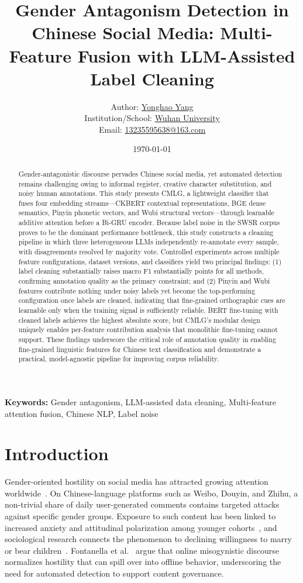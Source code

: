 ﻿\documentclass[12pt]{article}
\title{Gender Antagonism Detection in Chinese Social Media: Multi-Feature Fusion with LLM-Assisted Label Cleaning}
\author{%
Author: \underline{Yonghao Yang} \\
Institution/School: \underline{Wuhan University} \\
Email: \underline{13235595638@163.com}%
}
\date{\today}
\begin{document}
\maketitle

\begin{abstract}
Gender-antagonistic discourse pervades Chinese social media, yet automated detection remains challenging owing to informal register, creative character substitution, and noisy human annotations. This study presents CMLG, a lightweight classifier that fuses four embedding streams---CKBERT contextual representations, BGE dense semantics, Pinyin phonetic vectors, and Wubi structural vectors---through learnable additive attention before a Bi-GRU encoder. Because label noise in the SWSR corpus proves to be the dominant performance bottleneck, this study constructs a cleaning pipeline in which three heterogeneous LLMs independently re-annotate every sample, with disagreements resolved by majority vote. Controlled experiments across multiple feature configurations, dataset versions, and classifiers yield two principal findings: (1) label cleaning substantially raises macro F1 substantially points for all methods, confirming annotation quality as the primary constraint; and (2) Pinyin and Wubi features contribute nothing under noisy labels yet become the top-performing configuration once labels are cleaned, indicating that fine-grained orthographic cues are learnable only when the training signal is sufficiently reliable. BERT fine-tuning with cleaned labels achieves the highest absolute score, but CMLG's modular design uniquely enables per-feature contribution analysis that monolithic fine-tuning cannot support. These findings underscore the critical role of annotation quality in enabling fine-grained linguistic features for Chinese text classification and demonstrate a practical, model-agnostic pipeline for improving corpus reliability.
\end{abstract}

\noindent\textbf{Keywords:} Gender antagonism, LLM-assisted data cleaning, Multi-feature attention fusion, Chinese NLP, Label noise

\section{Introduction}
Gender-oriented hostility on social media has attracted growing attention worldwide~\cite{luo2025survey,qin2024impact}. On Chinese-language platforms such as Weibo, Douyin, and Zhihu, a non-trivial share of daily user-generated comments contains targeted attacks against specific gender groups. Exposure to such content has been linked to increased anxiety and attitudinal polarization among younger cohorts~\cite{qin2024impact}, and sociological research connects the phenomenon to declining willingness to marry or bear children~\cite{qin2024impact,fontanella2024misogyny}. Fontanella et al.~\cite{fontanella2024misogyny} argue that online misogynistic discourse normalizes hostility that can spill over into offline behavior, underscoring the need for automated detection to support content governance.
\end{document}
